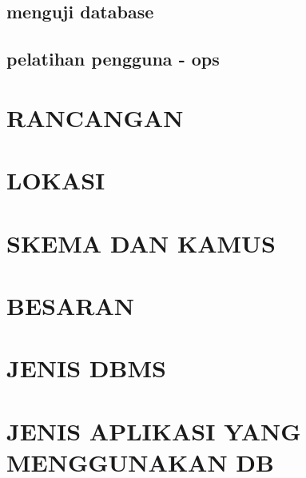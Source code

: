\documentclass[pdftex,12pt, oneside]{article}
\begin{document}
\subsection{menguji database}

\subsection{pelatihan pengguna - ops}


\section{RANCANGAN}


\section{LOKASI}

\section{SKEMA DAN KAMUS}

\section{BESARAN}

\section{JENIS DBMS}

\section{JENIS APLIKASI YANG MENGGUNAKAN DB}
\end{document}

